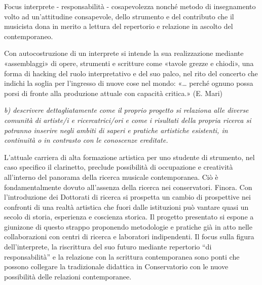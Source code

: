 \documentclass{gs-adonis}
\begin{document}
Focus interprete - responsabilità - cosapevolezza
nonché metodo di insegnamento volto ad un'attitudine consapevole, dello strumento e del
contributo che il musicista dona in merito a lettura del repertorio e relazione in ascolto
del contemporaneo.

Con autocostruzione di un interprete si intende la sua realizzazione mediante
«assemblaggi» di opere, strumenti e scritture come «tavole grezze e chiodi»,
una forma di hacking del ruolo interpretativo e del suo palco, nel rito del concerto che indichi la soglia per l'ingresso di nuove cose nel mondo:
«… perché ognuno possa porsi di fronte alla produzione
attuale con capacità critica.» (E. Mari)

\emph{b) descrivere dettagliatamente come il proprio progetto si relaziona alle diverse comunità di artiste/i e ricercatrici/ori e come i risultati della propria ricerca si potranno inserire negli ambiti di saperi e pratiche artistiche esistenti, in continuità o in contrasto con le conoscenze ereditate.}

L'attuale carriera di alta formazione artistica per uno studente di strumento,
nel caso specifico il clarinetto, preclude possibilità di occupazione e
creatività all'interno del panorama della ricerca musicale contemporanea. Ciò
è fondamentalmente dovuto all'assenza della ricerca nei conservatori. Finora.
Con l'introduzione dei Dottorati di ricerca si prospetta un cambio di
prospettive nei confronti di una realtà artistica che fuori dalle istituzioni
può vantare quasi un secolo di storia, esperienza e coscienza storica. Il
progetto presentato si espone a giunizone di questo strappo proponendo
metodologie e pratiche già in atto nelle collaborazioni con centri di ricerca e
laboratori indipendenti. Il focus sulla figura dell'interprete, la riscrittura
del suo futuro mediante repertorio “di responsabilità” e la relazione con
la scrittura contemporanea sono ponti che possono collegare la tradizionale
didattica in Conservatorio con le nuove possibilità delle relazioni
contemporanee.

\clearpage
\raggedright
\nocite{*}
%
\printbibliography
\end{document}
